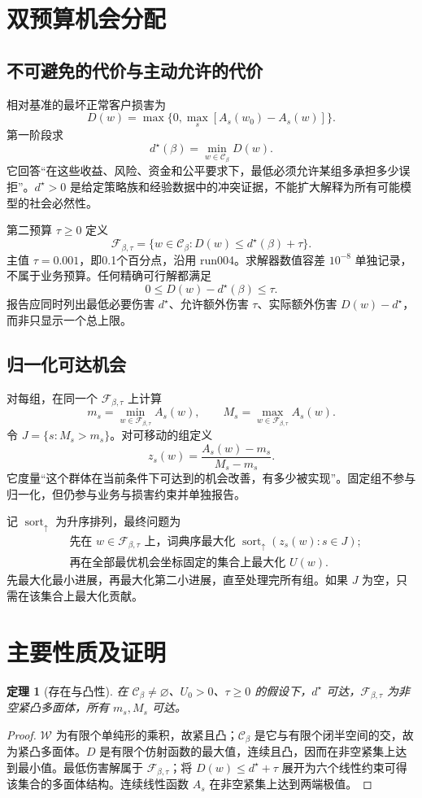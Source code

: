 \documentclass[UTF8,11pt,fontset=fandol]{ctexart}
\newtheorem{theorem}{定理}[section]
\newcommand{\C}{\mathcal C}
\newcommand{\F}{\mathcal F}
\newcommand{\W}{\mathcal W}
\begin{document}
\section{双预算机会分配}
\subsection{不可避免的代价与主动允许的代价}
相对基准的最坏正常客户损害为
\[
D(w)=\max\{0,\max_s[A_s(w_0)-A_s(w)]\}.
\]
第一阶段求
\[
d^\star(\beta)=\min_{w\in\C_\beta}D(w).
\]
它回答“在这些收益、风险、资金和公平要求下，最低必须允许某组多承担多少误拒”。$d^\star>0$ 是给定策略族和经验数据中的冲突证据，不能扩大解释为所有可能模型的社会必然性。

第二预算 $\tau\ge0$ 定义
\[
\F_{\beta,\tau}=\{w\in\C_\beta:D(w)\le d^\star(\beta)+\tau\}.
\]
主值 $\tau=0.001$，即0.1个百分点，沿用 run004。求解器数值容差 $10^{-8}$ 单独记录，不属于业务预算。任何精确可行解都满足
\[
0\le D(w)-d^\star(\beta)\le\tau.
\]
报告应同时列出最低必要伤害 $d^\star$、允许额外伤害 $\tau$、实际额外伤害 $D(w)-d^\star$，而非只显示一个总上限。

\subsection{归一化可达机会}
对每组，在同一个 $\F_{\beta,\tau}$ 上计算
\[
m_s=\min_{w\in\F_{\beta,\tau}}A_s(w),\qquad
M_s=\max_{w\in\F_{\beta,\tau}}A_s(w).
\]
令 $J=\{s:M_s>m_s\}$。对可移动的组定义
\[
z_s(w)=\frac{A_s(w)-m_s}{M_s-m_s}.
\]
它度量“这个群体在当前条件下可达到的机会改善，有多少被实现”。固定组不参与归一化，但仍参与业务与损害约束并单独报告。

记 $\operatorname{sort}_{\uparrow}$ 为升序排列，最终问题为
\[
\boxed{
\begin{aligned}
&\text{先在 }w\in\F_{\beta,\tau}\text{ 上，词典序最大化 }
   \operatorname{sort}_{\uparrow}(z_s(w):s\in J);\\
&\text{再在全部最优机会坐标固定的集合上最大化 }U(w).
\end{aligned}}
\]
先最大化最小进展，再最大化第二小进展，直至处理完所有组。如果 $J$ 为空，只需在该集合上最大化贡献。

\section{主要性质及证明}
\begin{theorem}[存在与凸性]
在 $\C_\beta\ne\varnothing$、$U_0>0$、$\tau\ge0$ 的假设下，$d^\star$ 可达，$\F_{\beta,\tau}$ 为非空紧凸多面体，所有 $m_s,M_s$ 可达。
\end{theorem}
\begin{proof}
$\W$ 为有限个单纯形的乘积，故紧且凸；$\C_\beta$ 是它与有限个闭半空间的交，故为紧凸多面体。$D$ 是有限个仿射函数的最大值，连续且凸，因而在非空紧集上达到最小值。最低伤害解属于 $\F_{\beta,\tau}$；将 $D(w)\le d^\star+\tau$ 展开为六个线性约束可得该集合的多面体结构。连续线性函数 $A_s$ 在非空紧集上达到两端极值。
\end{proof}
\end{document}
